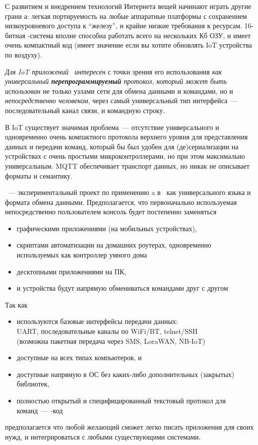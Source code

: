 \clearpage
{}

С развитием и внедрением технологий Интернета вещей начинают играть другие грани
\F а: легкая портируемость на любые аппаратные платформы с сохранением
низкоуровневого доступа к ``железу'', и крайне низкие требования к ресурсам.
16-битная \F-система вполне способна работать всего на нескольких Кб ОЗУ, и
имеет очень компактный код (имеет значение если вы хотите обновлять IoT
устройства по воздуху).

\emph{Для IoT приложений \F\ интересен} с точки зрения его использования
\emph{как универсальный \textbf{перепрограммируемый} протокол, который может
быть использован} не только узлами сети для обмена данными и командами, но и
\emph{непосредственно человеком}, через самый универсальный тип
интерфейса\ --- последовательный канал связи, и командную строку.

\clearpage
В IoT существует значимая проблема\ --- отсутствие универсального и одновременно
очень компактного протокола верхнего уровня для представления данных и передачи
команд, который бы был удобен для (де)сери\-али\-зации на устройствах с очень
простыми микроконтроллерами, но при этом максимально универсальным. MQTT
обеспечивает транспорт данных, но никак не описывает форматы и семантику.

\kf\ --- экспериментальный проект по применению \F a в \iot\ как
универсального языка и формата обмена данными. Предполагается, что первоначально
используемая непосредственно пользователем консоль будет постепенно заменяться
\begin{itemize}[nosep]
  \item 
графическими приложениями (на мобильных устройствах), 
  \item 
скриптами автоматизации на домашних роутерах, одновременно используемых как
контроллер умного дома
  \item 
десктопными приложениями на ПК,
  \item
и устройства будут напрямую обмениваться командами друг с другом
\end{itemize} 

\clearpage
Так как
\begin{itemize} 
  \item 
используются базовые интерфейсы передачи данных:\\UART, последовательные
каналы по WiFi/BT, telnet/SSH\\(возможна пакетная передача через SMS, LoraWAN,
NB-IoT)
  \item 
доступные на всех типах компьютеров, и 
  \item 
доступные напрямую в ОС без каких-либо дополнительных (закрытых) библиотек,
  \item 
полностью открытый и специфицированный текстовый протокол для команд\ --- \F-код 
\end{itemize}
предполагается что любой желающий сможет легко писать приложения для своих нужд,
и интегрироваться с любыми существующими системами.

